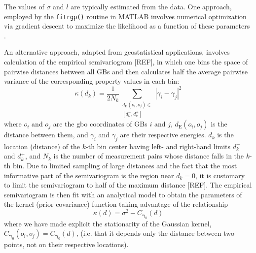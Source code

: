 \documentclass[final,twocolumn,12pt]{elsarticle}
\begin{document}
    The values of $\sigma$ and $l$ are typically estimated from the data. One approach, employed by the \texttt{fitrgp()} routine in MATLAB involves numerical optimization via gradient descent to maximize the likelihood as a function of these parameters \cite{ExactGPRMethod}.
    
    An alternative approach, adapted from geostatistical applications, involves calculation of the empirical semivariogram [REF], in which one bins the space of pairwise distances between all GBs and then calculates half the average pairwise variance of the corresponding property values in each bin:
    \begin{equation}
        \label{eq:semivariogram}
        \kappa\!\left(d_k\right) = \frac{1}{2N_k} \sum_{\substack{d_{\text{E}}\left(o_i,o_j\right) \in \\ \left[d_k^-,d_k^+\right]}} {\left| \gamma_i - \gamma_j\right|}^2
    \end{equation}
    where $o_i$ and $o_j$ are the \gls{gbo} coordinates of GBs $i$ and $j$, $d_{\text{E}}\left(o_i,o_j\right)$ is the distance between them, and $\gamma_i$ and $\gamma_j$ are their respective energies. $d_k$ is the location (distance) of the $k$-th bin center having left- and right-hand limits $d_k^-$ and $d_k^+$, and $N_k$ is the number of measurement pairs whose distance falls in the $k$-th bin. Due to limited sampling of large distances and the fact that the most informative part of the semivariogram is the region near $d_k = 0$, it is customary to limit the semivariogram to half of the maximum distance [REF]. The empirical semivariogram is then fit with an analytical model to obtain the parameters of the kernel (prior covariance) function taking advantage of the relationship
    \begin{equation}
        \label{eq:analyticalsemivariogrammodel}
        \kappa\!\left(d\right) = \sigma^2 - C_{\boldsymbol{\gamma}_0}\!\left(d\right)
    \end{equation}
    where we have made explicit the stationarity of the Gaussian kernel, $C_{\boldsymbol{\gamma}_0}\!\left(o_i,o_j\right) = C_{\boldsymbol{\gamma}_0}\!\left(d\right)$, (i.e. that it depends only the distance between two points, not on their respective locations).
    
\end{document}
